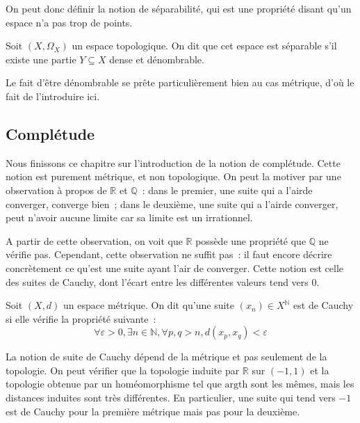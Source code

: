 On peut donc définir la notion de séparabilité, qui est une propriété disant
qu'un espace n'a pas trop de points.

\begin{definition}
  Soit $(X,\Omega_X)$ un espace topologique. On dit que cet espace est
  séparable s'il existe une partie $Y\subseteq X$ dense et dénombrable.
\end{definition}

Le fait d'être dénombrable se prête particulièrement bien au cas métrique,
d'où le fait de l'introduire ici.

\subsection{Complétude}

Nous finissons ce chapitre sur l'introduction de la notion de complétude. Cette
notion est purement métrique, et non topologique. On peut la motiver par une
observation à propos de $\mathbb R$ et $\mathbb Q$~: dans le premier, une
suite qui \og a l'air\fg de converger, converge bien~; dans le deuxième,
une suite qui \og a l'air\fg de converger, peut n'avoir aucune limite car sa
limite est un irrationnel.

A partir de cette observation, on voit que $\mathbb R$ possède une propriété que
$\mathbb Q$ ne vérifie pas. Cependant, cette observation ne suffit pas~: il faut
encore décrire concrètement ce qu'est une suite ayant l'air de converger. Cette
notion est celle des suites de Cauchy, dont l'écart entre les différentes
valeurs tend vers $0$.

\begin{definition}
  Soit $(X,d)$ un espace métrique. On dit qu'une suite $(x_n)\in X^\mathbb N$
  est de Cauchy si elle vérifie la propriété suivante~:
  \[\forall \varepsilon > 0, \exists n \in \mathbb N, \forall p,q > n,
  d(x_p,x_q) < \varepsilon\]
\end{definition}

\begin{remark}
  La notion de suite de Cauchy dépend de la métrique et pas seulement de la
  topologie. On peut vérifier que la topologie induite par $\mathbb R$ sur
  $(-1,1)$ et la topologie obtenue par un homéomorphisme tel que
  $\mathrm{argth}$ sont les mêmes, mais les distances induites sont très
  différentes. En particulier, une suite qui tend vers $-1$ est de Cauchy pour
  la première métrique mais pas pour la deuxième.
\end{remark}

